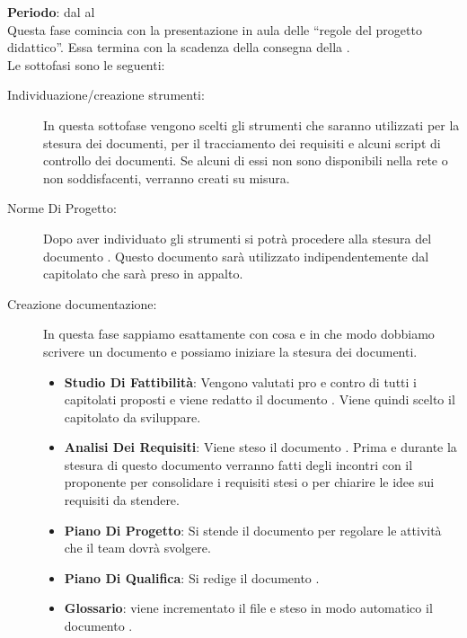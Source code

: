 	\textbf{Periodo}: dal  al  \\
	Questa fase comincia con la presentazione in aula delle “regole del progetto didattico”. Essa termina con la scadenza della consegna della .\\Le sottofasi sono le seguenti:
	\begin{description}
		\item[Individuazione/creazione strumenti:] In questa sottofase vengono scelti gli strumenti che saranno utilizzati per la stesura dei documenti, per il tracciamento dei requisiti e alcuni script di controllo dei documenti. Se alcuni di essi non sono disponibili nella rete o non soddisfacenti, verranno creati su misura.
		\item[Norme Di Progetto:] Dopo aver individuato gli strumenti si potrà procedere alla stesura del documento . Questo documento sarà utilizzato indipendentemente dal capitolato che sarà preso in appalto.
		\item[Creazione documentazione:] In questa fase sappiamo esattamente con cosa e in che modo dobbiamo scrivere un documento e possiamo iniziare la stesura dei documenti.
			\begin{itemize}
				\item \textbf{Studio Di Fattibilità}: Vengono valutati pro e contro di tutti i capitolati proposti e viene redatto il documento . Viene quindi scelto il capitolato da sviluppare.
				\item \textbf{Analisi Dei Requisiti}: Viene steso il documento . Prima e durante la stesura di questo documento verranno fatti degli incontri con il proponente per consolidare i requisiti stesi o per chiarire le idee sui requisiti da stendere.
				\item \textbf{Piano Di Progetto}: Si stende il documento  per regolare le attività che il team dovrà svolgere.
				\item \textbf{Piano Di Qualifica}: Si redige il documento .
				\item \textbf{Glossario}: viene incrementato il file   e steso in modo automatico il documento .
			\end{itemize}
	\end{description}
